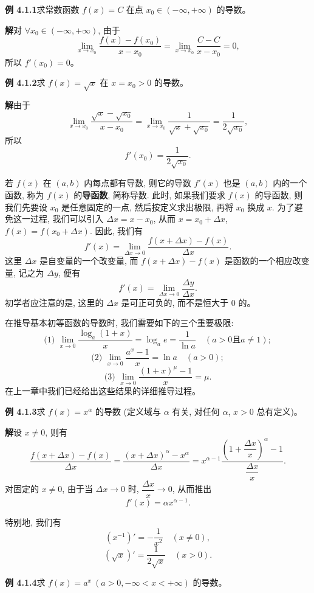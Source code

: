 \documentclass[UTF8, 12pt, fontset=fandol, oneside]{ctexart}
\begin{document}
\noindent\textbf{例 4.1.1}\quad 求常数函数 $f(x)=C$ 在点 $x_0\in(-\infty,+\infty)$ 的导数。

\noindent\textbf{解}\quad 对 $\forall x_0\in(-\infty,+\infty)$, 由于
\[
  \lim_{x\to x_0}\frac{f(x)-f(x_0)}{x-x_0}
  =
  \lim_{x\to x_0}\frac{C-C}{x-x_0}=0,
\]
所以 $f'(x_0)=0$。

\noindent\textbf{例 4.1.2}\quad 求 $f(x)=\sqrt{x}$ 在 $x=x_0>0$ 的导数。

\noindent\textbf{解}\quad 由于
\[
  \lim_{x\to x_0}\frac{\sqrt{x}-\sqrt{x_0}}{x-x_0}
  =
  \lim_{x\to x_0}\frac1{\sqrt{x}+\sqrt{x_0}}
  =
  \frac1{2\sqrt{x_0}},
\]
所以
\[
  f'(x_0)=\frac1{2\sqrt{x_0}}.
\]

若 $f(x)$ 在 $(a,b)$ 内每点都有导数, 则它的导数 $f'(x)$ 也是 $(a,b)$ 内的一个函数, 称为 $f(x)$ 的\textbf{导函数}, 简称导数. 此时, 如果我们要求 $f(x)$ 的导函数, 则我们先要设 $x_0$ 是任意固定的一点, 然后按定义求出极限, 再将 $x_0$ 换成 $x$. 为了避免这一过程, 我们可以引入 $\Delta x=x-x_0$, 从而 $x=x_0+\Delta x$, $f(x)=f(x_0+\Delta x)$. 因此, 我们有
\[
  f'(x)=
  \lim_{\Delta x\to0}\frac{f(x+\Delta x)-f(x)}{\Delta x}.
\]
这里 $\Delta x$ 是自变量的一个改变量, 而 $f(x+\Delta x)-f(x)$ 是函数的一个相应改变量, 记之为 $\Delta y$, 便有
\[
  f'(x)=\lim_{\Delta x\to0}\frac{\Delta y}{\Delta x}.
\]
初学者应注意的是, 这里的 $\Delta x$ 是可正可负的, 而不是恒大于 $0$ 的。

在推导基本初等函数的导数时, 我们需要如下的三个重要极限:
\[
  \text{(1) }\lim_{x\to0}\frac{\log_a(1+x)}{x}
  =
  \log_a e
  =
  \frac1{\ln a}\quad(a>0\text{且}a\ne1);
\]
\[
  \text{(2) }\lim_{x\to0}\frac{a^x-1}{x}
  =
  \ln a\quad(a>0);
\]
\[
  \text{(3) }\lim_{x\to0}\frac{(1+x)^\mu-1}{x}
  =
  \mu.
\]
在上一章中我们已经给出这些结果的详细推导过程。

\noindent\textbf{例 4.1.3}\quad 求 $f(x)=x^\alpha$ 的导数 (定义域与 $\alpha$ 有关, 对任何 $\alpha$, $x>0$ 总有定义)。

\noindent\textbf{解}\quad 设 $x\ne0$, 则有
\[
  \frac{f(x+\Delta x)-f(x)}{\Delta x}
  =
  \frac{(x+\Delta x)^\alpha-x^\alpha}{\Delta x}
  =
  x^{\alpha-1}
  \frac{\left(1+\dfrac{\Delta x}{x}\right)^\alpha-1}
       {\dfrac{\Delta x}{x}}.
\]
对固定的 $x\ne0$, 由于当 $\Delta x\to0$ 时, $\dfrac{\Delta x}{x}\to0$, 从而推出
\[
  f'(x)=\alpha x^{\alpha-1}.
\]

特别地, 我们有
\[
  (x^{-1})'=-\frac1{x^2}\quad(x\ne0),
\]
\[
  (\sqrt{x})'=\frac1{2\sqrt{x}}\quad(x>0).
\]

\noindent\textbf{例 4.1.4}\quad 求 $f(x)=a^x\ (a>0,-\infty<x<+\infty)$ 的导数。
\end{document}

